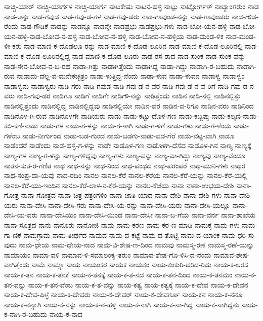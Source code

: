 ನಾಚ್ಚಿ-ಯಾರ್
ನಾಚ್ಚಿ-ಯಾರ್ಗಳ
ನಾಚ್ಚಿ-ಯಾರ್ಗೆ
ನಾಟಕೇಷು
ನಾಟನ-ಹಳ್ಳಿ
ನಾಟ್ಟು
ನಾಟ್ಟೋರ್ಗಳ್
ನಾಟ್ಯಾಂಗರುಂ
ನಾಡ
ನಾಡ-ಅನ್ನು
ನಾಡ-ಗವುಡ
ನಾಡ-ಗವು-ಡ-ಗಳ
ನಾಡ-ಗವು-ಡರು
ನಾಡ-ಗಾವುಂಡ-ನನ್ನು
ನಾಡ-ಗಾವುಂಡರು
ನಾಡ-ಗೌಡ-ರೆಂದು
ನಾಡ-ಗೌಡಿಕೆ
ನಾಡನ್ನು
ನಾಡನ್ನೂ
ನಾಡನ್ನೇ
ನಾಡಪ್ರಭು
ನಾಡಪ್ರಭು-ಗಳು
ನಾಡ-ಬೋ-ಯನ-ಹಳ್ಳಿ
ನಾಡ-ಬೋ-ಯನ-ಹಳ್ಳಿ-ನಾಡ-ಬೋವ-ನ-ಹಳ್ಳಿ
ನಾಡ-ಬೋವ-ನ-ಹಳ್ಳಿ
ನಾಡ-ಬೋವ-ನ-ಹಳ್ಳಿಯ
ನಾಡ-ಮಂಡ-ಳಿಕ
ನಾಡ-ಮಂಡ-ಳೀ-ಕರು
ನಾಡ-ಮಾಣಿ-ಕ-ದೊಡಲೂ-ರನ್ನು
ನಾಡ-ಮಾಣಿ-ಕ-ದೊಡ-ಲೂರಿನ
ನಾಡ-ಮಾಣಿ-ಕ-ದೊಡ-ಲೂರಿನಲ್ಲಿ
ನಾಡ-ಮಾಣಿ-ಕ-ದೊಡ-ಲೂರಿನಲ್ಲಿದ್ದ
ನಾಡ-ಮಾಣಿ-ಕ-ದೊಡ-ಲೂರು
ನಾಡ-ರಸ-ರಾದ
ನಾಡ-ಸುಂಕ
ನಾಡ-ಸುಂಕ-ವನ್ನು
ನಾಡ-ಸೇನ-ಬೋವ-ನ-ಬ-ರಹ
ನಾಡಾ-ಗಿತ್ತು
ನಾಡಾಗಿತ್ತೆಂದು
ನಾಡಾಗಿದ್ದ
ನಾಡಾ-ಗಿದ್ದು
ನಾಡಾಗಿ-ರ-ಬಹುದು
ನಾಡಾಗಿ-ರುವ
ನಾಡಾದು-ದೆಲ್ಲ-ವ-ಮನೇಕಚ್ಛತ್ರಂ
ನಾಡಾ-ಳುತ್ತಿದ್ದ-ನೆಂದು
ನಾಡಾ-ಳುವ
ನಾಡಾ-ಳುವನ
ನಾಡಾಳ್ವ
ನಾಡಾಳ್ವಂ
ನಾಡಾಳ್ವನು
ನಾಡಾಳ್ವರು
ನಾಡಿ-ಗರು
ನಾಡಿ-ಗವುಡ
ನಾಡಿ-ಗವು-ಡ-ನ-ವರ
ನಾಡಿ-ಗವು-ಡ-ನ-ವ-ರಿಗೆ
ನಾಡಿ-ಗವು-ಡ-ನ-ವರು
ನಾಡಿ-ಗವು-ಡರ
ನಾಡಿಗೂ
ನಾಡಿಗೆ
ನಾಡಿಗೇ
ನಾಡಿಗೌ-ನನ್ನು
ನಾಡಿತ್ತೆಂದು
ನಾಡಿನ
ನಾಡಿ-ನಲ್ಲಿ
ನಾಡಿನಲ್ಲಿತ್ತು
ನಾಡಿನಲ್ಲಿತ್ತೆಂದು
ನಾಡಿನಲ್ಲಿದ್ದ
ನಾಡಿನಲ್ಲಿದ್ದವು
ನಾಡಿನಲ್ಲಿಯೇ
ನಾಡಿನ-ವರ
ನಾಡಿನ-ವ-ರಿಗೂ
ನಾಡಿನ-ವರು
ನಾಡಿನಿಂದ
ನಾಡಿನೊಳ-ಗಿ-ರುವ
ನಾಡಿನೊಳಗೇ
ನಾಡಿಯರು
ನಾಡು
ನಾಡು-ಕಟ್ಟು-ದೊಳ-ಗಣ
ನಾಡು-ಕಬ್ಬಪ್ಪು
ನಾಡು-ಕಲ್ಕಣಿ-ನಾಡು-ಕಲಿ-ಕಣಿ-ನಾಡು
ನಾಡು-ಗಳ
ನಾಡು-ಗ-ಳನ್ನು
ನಾಡು-ಗ-ಳಾಗಿ
ನಾಡು-ಗ-ಳಿಗೆ
ನಾಡು-ಗಳು
ನಾಡು-ಗ-ಳೆಂದು
ನಾಡು-ಗಳೆಂಬ
ನಾಡು-ನೀರ್ಗುಂದ
ನಾಡು-ಬಡ-ಗುಂದ
ನಾಡು-ಬಡಗು-ನಾಡು-ವಡ-ಗೆರೆ
ನಾಡು-ವಟ್ಟ-ವಾಗಿ
ನಾಡೂ
ನಾಡೆಂದರೆ
ನಾಡೆಂದು
ನಾಡೆ-ಹಳ್ಳಿ-ಗ-ಳನ್ನು
ನಾಡೇ
ನಾಡೊಳ-ಗಣ
ನಾಡೊಳಗಿ-ದೆಸೆದ
ನಾಡೊಳ-ಗಿನ
ನಾಣ್ಯ
ನಾಣ್ಯಕ್ಕೆ
ನಾಣ್ಯ-ಗಳ
ನಾಣ್ಯ-ಗ-ಳನ್ನು
ನಾಣ್ಯ-ಗಳಿದ್ದವು
ನಾಣ್ಯ-ಗಳು
ನಾಣ್ಯ-ವನ್ನು
ನಾಣ್ಯ-ವಾ-ಗಿದ್ದು
ನಾಣ್ಯವು
ನಾಣ್ಯ-ವೆಂದೂ
ನಾತನ-ಸುತ-ರ-ಗಣಿತ
ನಾಥ
ನಾಥ-ನನ್ನು
ನಾಥ-ನಿಂದ
ನಾಥ-ಪಂಥದ
ನಾಥ-ಪರಂಪರೆ
ನಾಥ-ಮುನಿ-ಗಳು
ನಾಥರ
ನಾಥ-ಸಂಪ್ರ-ದಾ-ಯವು
ನಾದ-ರದಿಂ
ನಾನಲ
ನಾನಲ-ಕೆರೆ
ನಾನಲ-ಕೆರೆಯ
ನಾನಲ-ಕೆರೆ-ಯನ್ನು
ನಾನಲ-ಕೆರೆ-ಯಲ್ಲಿ
ನಾನಲ-ಕೆರೆ-ಯು-ಇಂದಿನ
ನಾನಲ-ಕೆರೆ-ಲಾಳ-ನ-ಕೆರೆ-ಯನ್ನು
ನಾನಲ-ಕೆಱೆಯ
ನಾನಾ
ನಾನಾ-ಉಭಯ-ದೇಶಿ
ನಾನಾ-ಗೋತ್ರ
ನಾನಾ-ಗೋತ್ರದ
ನಾನಾ-ಚಿತ್ರ-ಪತ್ರಂಗಳಿಂ
ನಾನಾ-ಜಾತಿ-ಯಾದ
ನಾನಾ-ದೇಶಿ
ನಾನಾ-ದೇಶಿ-ಗಳು
ನಾನಾ-ದೇಶಿ-ಯರು
ನಾನಾ-ದೇಸಿ
ನಾನಾ-ದೇಸಿ-ಗರು
ನಾನಾ-ದೇಸಿ-ಯ-ರನ್ನು
ನಾನಾ-ದೇಸಿ-ಯರು
ನಾನಾ-ದೇಸಿ-ಯಲ್ಲೂ
ನಾನಾ-ದೇಸಿ-ಯ-ವರು
ನಾನಾ-ದೇಸಿಯಿಂ
ನಾನಾ-ದೇಸಿ-ಯಿಂದ
ನಾನಾ-ದೇಸೀ
ನಾನಾ-ಬ-ಗೆಯ
ನಾನಾ-ವರ್ನ
ನಾನಾ-ಶಾಖೆಯ
ನಾನಾ-ಸೂತ್ರದ
ನಾನು
ನಾನೂರು
ನಾನೋಜಿ
ನಾಮ
ನಾಮ-ಕರಣ
ನಾಮ-ಕರ-ಣ-ಮಾಡಿ
ನಾಮಕ್ಕೆ
ನಾಮ-ಗಳು
ನಾಮ-ಗಾ-ಣಿಕೆ
ನಾಮಗ್ರಾಮ
ನಾಮ-ತೀರ್ಥದ
ನಾಮದ
ನಾಮ-ದ-ಕಟ್ಟೆ
ನಾಮ-ದ-ತೊಟ್ಟಿ
ನಾಮ-ದ-ಯಾಂಕ
ನಾಮ-ಧರಿ-ಸು-ವುದು
ನಾಮ-ಧೇಯ
ನಾಮ-ಧೇಯ-ನಾದ
ನಾಮ-ವಿ-ಶೇಷ-ಣ-ದಿಂದ
ನಾಮವು
ನಾಮಸ್ಮ-ರಣೆ
ನಾಮಸ್ಮ-ರಣೆ-ಯನ್ನು
ನಾಮಾಯಂ
ನಾಮಾ-ವಳಿ
ನಾಮಾವ-ಳಿ-ಸಮಾಲಂಕೃ-ತರುಂ
ನಾಮಾವ-ಶೇಷ-ಗೊ-ಳಿಸಿ-ದ-ನೆಂದು
ನಾಮಾವ-ಶೇಷ-ವಾಗಿತ್ತೆಂದು
ನಾಮೆ
ನಾಮ್ನಾ
ನಾಯ
ನಾಯಂಕರ
ನಾಯಕ
ನಾಯಕಂ
ನಾಯ-ಕಂಕುರಿ-ದರಿದ-ರಿದು
ನಾಯ-ಕ-ಅರಸ
ನಾಯ-ಕ-ತನ
ನಾಯ-ಕ-ತನಕೆ
ನಾಯ-ಕ-ತನಕ್ಕೆ
ನಾಯ-ಕ-ತ-ನದ
ನಾಯ-ಕ-ತನ-ದಿಂದ
ನಾಯ-ಕ-ತನಮಂ
ನಾಯ-ಕ-ತನ-ವನ್ನು
ನಾಯ-ಕ-ತನ-ವೆಂಬ
ನಾಯ-ಕ-ತ-ವನ್ನು
ನಾಯ-ಕತ್ವ
ನಾಯ-ಕತ್ವಕ್ಕೆ
ನಾಯ-ಕ-ದೇವ
ನಾಯ-ಕ-ದೇವನ
ನಾಯ-ಕ-ದೇವ-ಪಿಳ್ಳೆ
ನಾಯ-ಕ-ದೇವರು
ನಾಯ-ಕ-ದೇವರ್
ನಾಯ-ಕ-ದೇವರ್ಗೂ
ನಾಯ-ಕನ
ನಾಯ-ಕ-ನನೂ
ನಾಯ-ಕ-ನನ್ನಾಗಿ
ನಾಯ-ಕ-ನನ್ನು
ನಾಯ-ಕ-ನ-ಹಳ್ಳಿ
ನಾಯ-ಕ-ನಾಗಿ
ನಾಯ-ಕ-ನಾ-ಗಿದ್ದ
ನಾಯ-ಕ-ನಾಗಿದ್ದನು
ನಾಯ-ಕ-ನಾಗಿ-ರ-ಬಹುದು
ನಾಯ-ಕ-ನಾದ
